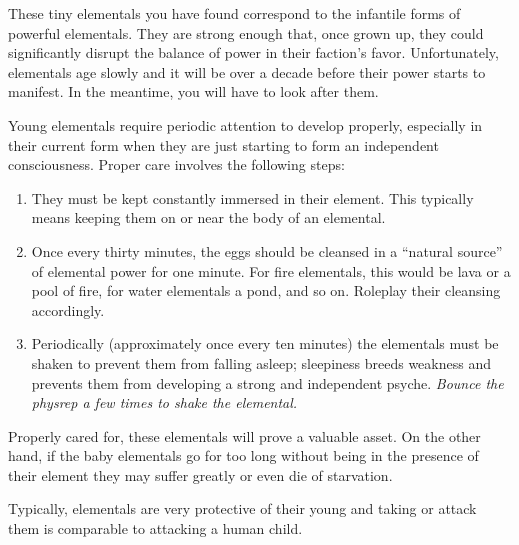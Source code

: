 \documentclass[green]{elementals}
\begin{document}
\name{\gElementalEggs{}}

These tiny elementals you have found correspond to the infantile forms of powerful elementals. They are strong enough that, once grown up, they could significantly disrupt the balance of power in their faction's favor. Unfortunately, elementals age slowly and it will be over a decade before their power starts to manifest. In the meantime, you will have to look after them.

Young elementals require periodic attention to develop properly, especially in their current form when they are just starting to form an independent consciousness. Proper care involves the following steps:
\begin{enumerate}
  \item They must be kept constantly immersed in their element. This typically means keeping them on or near the body of an elemental.
  \item Once every thirty minutes, the eggs should be cleansed in a ``natural source'' of elemental power for one minute. For fire elementals, this would be lava or a pool of fire, for water elementals a pond, and so on. Roleplay their cleansing accordingly.
  \item Periodically (approximately once every ten minutes) the elementals must be shaken to prevent them from falling asleep; sleepiness breeds weakness and prevents them from developing a strong and independent psyche. \emph{Bounce the physrep a few times to shake the elemental.}
\end{enumerate}

Properly cared for, these elementals will prove a valuable asset. On the other hand, if the baby elementals go for too long without being in the presence of their element they may suffer greatly or even die of starvation.

Typically, elementals are very protective of their young and taking or attack them is comparable to attacking a human child.
\end{document}
